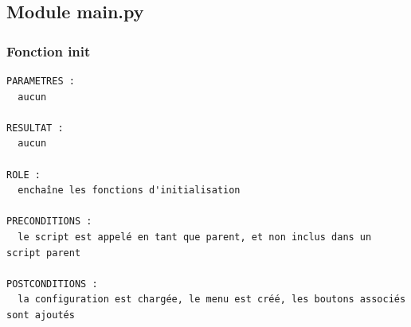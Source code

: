 \documentclass{article}
\begin{document}
\subsection{Module main.py}

\subsubsection{Fonction init}

\begin{verbatim}
PARAMETRES : 
  aucun

RESULTAT : 
  aucun

ROLE :
  enchaîne les fonctions d'initialisation

PRECONDITIONS : 
  le script est appelé en tant que parent, et non inclus dans un script parent

POSTCONDITIONS :
  la configuration est chargée, le menu est créé, les boutons associés sont ajoutés
\end{verbatim}
\end{document}
